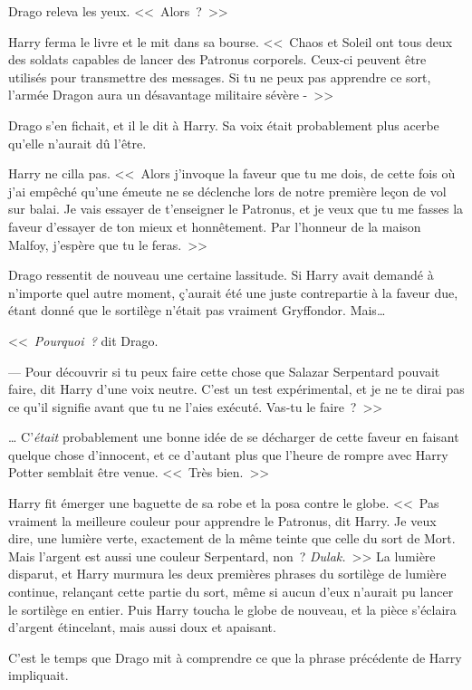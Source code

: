 Drago releva les yeux. <<~Alors~?~>>

Harry ferma le livre et le mit dans sa bourse. <<~Chaos et Soleil ont tous deux des soldats capables de lancer des Patronus corporels. Ceux-ci peuvent être utilisés pour transmettre des messages. Si tu ne peux pas apprendre ce sort, l'armée Dragon aura un désavantage militaire sévère -~>>

Drago s'en fichait, et il le dit à Harry. Sa voix était probablement plus acerbe qu'elle n'aurait dû l'être.

Harry ne cilla pas. <<~Alors j'invoque la faveur que tu me dois, de cette fois où j'ai empêché qu'une émeute ne se déclenche lors de notre première leçon de vol sur balai. Je vais essayer de t'enseigner le Patronus, et je veux que tu me fasses la faveur d'essayer de ton mieux et honnêtement. Par l'honneur de la maison Malfoy, j'espère que tu le feras.~>>

Drago ressentit de nouveau une certaine lassitude. Si Harry avait demandé à n'importe quel autre moment, ç'aurait été une juste contrepartie à la faveur due, étant donné que le sortilège n'était pas vraiment Gryffondor. Mais…

<<~\emph{Pourquoi~?} dit Drago.

--- Pour découvrir si tu peux faire cette chose que Salazar Serpentard pouvait faire, dit Harry d'une voix neutre. C'est un test expérimental, et je ne te dirai pas ce qu'il signifie avant que tu ne l'aies exécuté. Vas-tu le faire~?~>>

… C'\emph{était} probablement une bonne idée de se décharger de cette faveur en faisant quelque chose d'innocent, et ce d'autant plus que l'heure de rompre avec Harry Potter semblait être venue. <<~Très bien.~>>

Harry fit émerger une baguette de sa robe et la posa contre le globe. <<~Pas vraiment la meilleure couleur pour apprendre le Patronus, dit Harry. Je veux dire, une lumière verte, exactement de la même teinte que celle du sort de Mort. Mais l'argent est aussi une couleur Serpentard, non~? \emph{Dulak.}~>> La lumière disparut, et Harry murmura les deux premières phrases du sortilège de lumière continue, relançant cette partie du sort, même si aucun d'eux n'aurait pu lancer le sortilège en entier. Puis Harry toucha le globe de nouveau, et la pièce s'éclaira d'argent étincelant, mais aussi doux et apaisant.

C'est le temps que Drago mit à comprendre ce que la phrase précédente de Harry impliquait.

